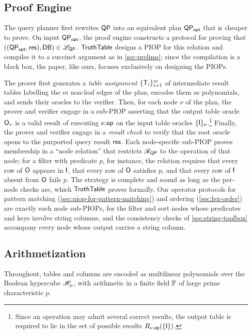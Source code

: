 \subsection{Proof Engine}
\label{sec:background-proof-engine}

The query planner first rewrites $\mathsf{QP}$ into an equivalent plan $\mathsf{QP}_{\mathsf{opt}}$ that is cheaper to prove.
On input $\mathsf{QP}_{\mathsf{opt}}$, the proof engine constructs a protocol for proving that $((\mathsf{QP}_{\mathsf{opt}}, \mathsf{res}), \mathsf{DB}) \in \mathscr{L}_{\mathsf{QP}}$.
$\mathsf{TruthTable}$ designs a PIOP for this relation and compiles it to a succinct argument as in \cref{sec:prelims}; since the compilation is a black box, the paper, like ours, focuses exclusively on designing the PIOPs.

The prover first generates a \emph{table assignment} $\{\mathsf{T}_i\}_{i=1}^m$ of intermediate result tables labelling the $m$ non-leaf edges of the plan, encodes them as polynomials, and sends their oracles to the verifier.
Then, for each node $\nu$ of the plan, the prover and verifier engage in a sub-PIOP asserting that the output table oracle ${\mathsf{O}}_\nu$ is a valid result of executing $\nu.\mathsf{op}$ on the input table oracles $\{{\mathsf{I}}\}_\nu$.\footnote{Since an operation may admit several correct results, the output table is required to lie in the set of possible results $R_{\nu.\mathsf{op}}(\{{\mathsf{I}}\})$.}
Finally, the prover and verifier engage in a \emph{result check} to verify that the root oracle opens to the purported query result $\mathsf{res}$.
Each node-specific sub-PIOP proves membership in a ``node relation'' that restricts $\mathscr{R}_{\mathsf{QP}}$ to the operation of that node; for a filter with predicate $p$, for instance, the relation requires that every row of ${\mathsf{O}}$ appears in ${\mathsf{I}}$, that every row of ${\mathsf{O}}$ satisfies $p$, and that every row of ${\mathsf{I}}$ absent from ${\mathsf{O}}$ fails $p$.
The strategy is complete and sound as long as the per-node checks are, which $\mathsf{TruthTable}$ proves formally.
Our operator protocols for pattern matching (\cref{sec:piop-for-pattern-matching}) and ordering (\cref{sec:lex-order}) are exactly such node sub-PIOPs, for the filter and sort nodes whose predicates and keys involve string columns, and the consistency checks of \cref{sec:string-toolbox} accompany every node whose output carries a string column.

\subsection{Arithmetization}
\label{sec:general-approach}
Throughout, tables and columns are encoded as multilinear polynomials over the Boolean hypercube $\mathscr{H}_{\mu}$, with arithmetic in a finite field $\mathbb{F}$ of large prime characteristic $p$.


